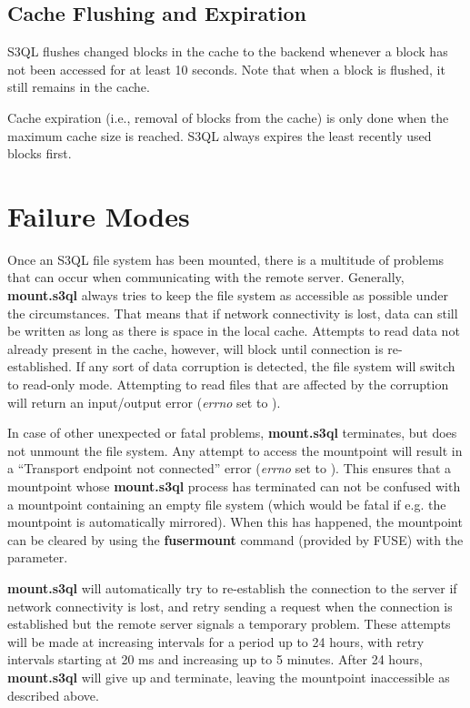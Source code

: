 \documentclass[letterpaper,10pt,english]{sphinxmanual}
\begin{document}
\subsection{Cache Flushing and Expiration}
\label{mount:cache-flushing-and-expiration}
S3QL flushes changed blocks in the cache to the backend whenever a block
has not been accessed for at least 10 seconds. Note that when a block is
flushed, it still remains in the cache.

Cache expiration (i.e., removal of blocks from the cache) is only done
when the maximum cache size is reached. S3QL always expires the least
recently used blocks first.


\section{Failure Modes}
\label{mount:failure-modes}
Once an S3QL file system has been mounted, there is a multitude of
problems that can occur when communicating with the remote
server. Generally, \textbf{mount.s3ql} always tries to keep the file
system as accessible as possible under the circumstances. That means
that if network connectivity is lost, data can still be written as
long as there is space in the local cache. Attempts to read data not
already present in the cache, however, will block until connection is
re-established. If any sort of data corruption is detected, the file
system will switch to read-only mode. Attempting to read files that
are affected by the corruption will return an input/output error
(\emph{errno} set to ).

In case of other unexpected or fatal problems, \textbf{mount.s3ql}
terminates, but does not unmount the file system. Any attempt to
access the mountpoint will result in a ``Transport endpoint not
connected'' error (\emph{errno} set to ). This ensures that a
mountpoint whose \textbf{mount.s3ql} process has terminated can not
be confused with a mountpoint containing an empty file system (which
would be fatal if e.g. the mountpoint is automatically mirrored). When
this has happened, the mountpoint can be cleared by using the
\textbf{fusermount} command (provided by FUSE) with the 
parameter.

\textbf{mount.s3ql} will automatically try to re-establish the
connection to the server if network connectivity is lost, and retry
sending a request when the connection is established but the remote
server signals a temporary problem. These attempts will be made at
increasing intervals for a period up to 24 hours, with retry intervals
starting at 20 ms and increasing up to 5 minutes. After 24 hours,
\textbf{mount.s3ql} will give up and terminate, leaving the
mountpoint inaccessible as described above.
\end{document}
